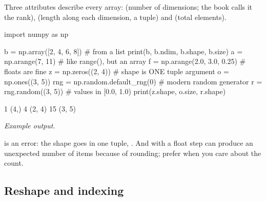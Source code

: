 Three attributes describe every array:  (number of dimensions; the book calls it the
rank),  (length along each dimension, a tuple) and  (total elements).

\begin{pycode}
import numpy as np

b = np.array([2, 4, 6, 8])          # from a list
print(b, b.ndim, b.shape, b.size)
a = np.arange(7, 11)                # like range(), but an array
f = np.arange(2.0, 3.0, 0.25)       # floats are fine
z = np.zeros((2, 4))                # shape is ONE tuple argument
o = np.ones((3, 5))
rng = np.random.default_rng(0)      # modern random generator
r = rng.random((3, 5))              # values in [0.0, 1.0)
print(z.shape, o.size, r.shape)
\end{pycode}
\begin{rawcode}
[2 4 6 8] 1 (4,) 4
(2, 4) 15 (3, 5)
\end{rawcode}
\noindent\textit{Example output.}

\begin{trap}
 is an error: the shape goes in one tuple, . And
 with a float step can produce an unexpected number of items because of rounding;
prefer  when you care about the count.
\end{trap}

\subsection{Reshape and indexing}

\begin{center}
\end{center}

